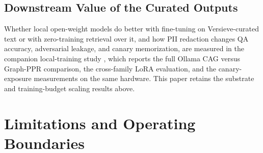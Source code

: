 \documentclass{article}
\begin{document}
\begin{table}[t]
\caption{Held-out scaling ablation ($n_{\text{test}}=299$). Gate BCE measures the 520-dim logistic scorer; VeRA BCE measures \texttt{mle\_dl\_vera\_loss\_grad} in \texttt{versieve\_dl.wasm}.}
\label{tab:ablation}
\vskip 0.08in
\begin{center}
\end{center}
\vskip -0.14in
\end{table}

\subsection{Downstream Value of the Curated Outputs}
\label{sec:trackc}

Whether local open-weight models do better with fine-tuning on Versieve-curated text or with zero-training retrieval over it, and how PII redaction changes QA accuracy, adversarial leakage, and canary memorization, are measured in the companion local-training study \citep{ardiyansyah2026localtraining}, which reports the full Ollama CAG versus Graph-PPR comparison, the cross-family LoRA evaluation, and the canary-exposure measurements on the same hardware. This paper retains the substrate and training-budget scaling results above.

\section{Limitations and Operating Boundaries}
\label{sec:limitations}
\end{document}
